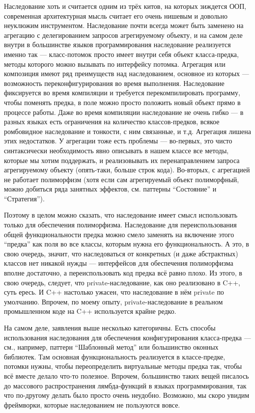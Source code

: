 \documentclass[a5paper]{article}
\begin{document}
Наследование хоть и считается одним из трёх китов, на которых зиждется ООП, современная архитектурная мысль считает его очень нишевым и довольно неуклюжим инструментом. Наследование почти всегда может быть заменено на агрегацию с делегированием запросов агрегируемому объекту, и на самом деле внутри в большинстве языков программирования наследование реализуется именно так --- класс-потомок просто имеет внутри себя объект класса-предка, методы которого можно вызывать по интерфейсу потомка. Агрегация или композиция имеют ряд преимуществ над наследованием, основное из которых --- возможность переконфигурирования во время выполнения. Наследование фиксируется во время компиляции и требуется перекомпилировать программу, чтобы поменять предка, в поле можно просто положить новый объект прямо в процессе работы. Даже во время компиляции наследование не очень гибко --- в разных языках есть ограничения на количество классов-предков, всякое ромбовидное наследование и тонкости, с ним связанные, и т.д. Агрегация лишена этих недостатков. У агрегации тоже есть проблемы --- во-первых, это чисто синтаксически необходимость явно описывать в нашем классе все методы, которые мы хотим поддержать, и реализовывать их перенаправлением запроса агрегируемому объекту (опять-таки, больше строк кода). Во-вторых, с агрегацией не работает полиморфизм (хотя если сам агрегируемый объект полиморфный, можно добиться ряда занятных эффектов, см. паттерны ``Состояние'' и ``Стратегия'').

Поэтому в целом можно сказать, что наследование имеет смысл использовать только для обеспечения полиморфизма. Наследование для переиспользования общей функциональности предка можно смело заменять на включение этого ``предка'' как поля во все классы, которым нужна его функциональность. А это, в свою очередь, значит, что наследоваться от конкретных (и даже абстрактных) классов нет никакой нужды --- интерфейсов для обеспечения полиморфизма вполне достаточно, а переиспользовать код предка всё равно плохо. Из этого, в свою очередь, следует, что private-наследование, как оно реализовано в C++, суть ересь. И C++ настолько ужасен, что наследование в нём private по умолчанию. Впрочем, по моему опыту, private-наследование в реальном промышленном коде на C++ используется крайне редко.

На самом деле, заявления выше несколько категоричны. Есть способы использования наследования для обеспечения конфигурирования класса-предка --- см., например, паттерн ``Шаблонный метод'' или большинство оконных библиотек. Там основная функциональность реализуется в классе-предке, потомки нужны, чтобы переопределить виртуальные методы предка так, чтобы всё вместе делало что-то полезное. Впрочем, большинство таких вещей писалось до массового распространения лямбда-функций в языках программирования, так что по-другому делать было просто очень неудобно. Возможно, мы скоро увидим фреймворки, которые наследованием не пользуются вовсе.
\end{document}
